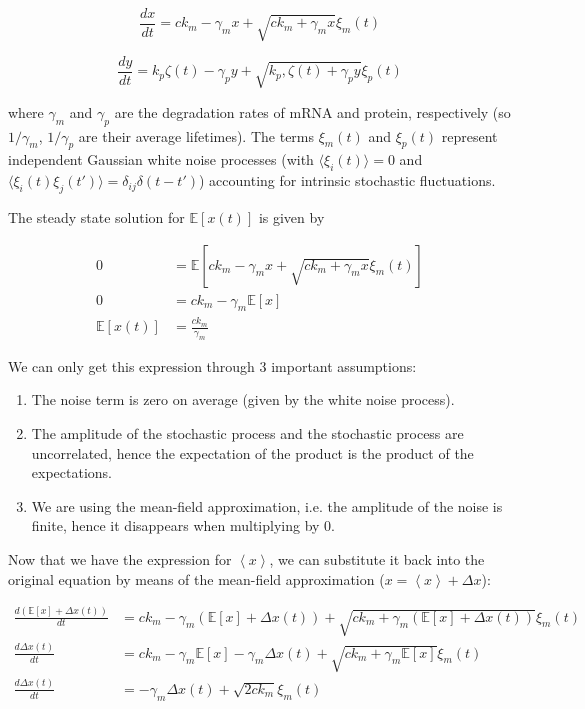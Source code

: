 \begin{equation} \frac{dx}{dt} = c k_m - \gamma_m x + \sqrt{c k_m + \gamma_m x}\xi_m(t) \end{equation}

\begin{equation} \frac{dy}{dt} = k_p\zeta(t) - \gamma_p y + \sqrt{k_p,\zeta(t) + \gamma_p y}\xi_p(t) \end{equation}

where $\gamma_m$ and $\gamma_p$ are the degradation rates of mRNA and protein, respectively (so $1/\gamma_m$, $1/\gamma_p$ are their average lifetimes). The terms $\xi_m(t)$ and $\xi_p(t)$ represent independent Gaussian white noise processes (with $\langle \xi_i(t)\rangle=0$ and $\langle \xi_i(t)\xi_j(t')\rangle=\delta_{ij}\delta(t-t')$) accounting for intrinsic stochastic fluctuations.

The steady state solution for $\mathbb{E}[x(t)]$ is given by

\begin{align*}
    0 &= \mathbb{E}\left[c k_m - \gamma_m x + \sqrt{c k_m + \gamma_m x}\xi_m(t)\right]\\
    0 &= c k_m - \gamma_m \mathbb{E}[x]\\
    \mathbb{E}[x(t)] &= \frac{c k_m}{\gamma_m}
\end{align*}

We can only get this expression through 3 important assumptions:

\begin{enumerate} \item The noise term is zero on average (given by the white noise process). \item The amplitude of the stochastic process and the stochastic process are uncorrelated, hence the expectation of the product is the product of the expectations. \item We are using the mean-field approximation, i.e. the amplitude of the noise is finite, hence it disappears when multiplying by 0. \end{enumerate} Now that we have the expression for $\left\langle x\right\rangle$, we can substitute it back into the original equation by means of the mean-field approximation ($x = \left\langle x\right\rangle + \Delta x$):

\begin{align*}
    \frac{d\left(\mathbb{E}[x] + \Delta x(t)\right)}{dt} &= c k_m - \gamma_m\left(\mathbb{E}[x] + \Delta x(t)\right) + \sqrt{c k_m + \gamma_m\left(\mathbb{E}[x] + \Delta x(t)\right)}\xi_m(t)\\
    \frac{d\Delta x(t)}{dt} &= c k_m - \gamma_m\mathbb{E}[x] - \gamma_m\Delta x(t) + \sqrt{c k_m + \gamma_m\mathbb{E}[x]}\xi_m(t)\\
    \frac{d\Delta x(t)}{dt} &= -\gamma_m\Delta x(t) + \sqrt{2c k_m}\xi_m(t)
\end{align*}

